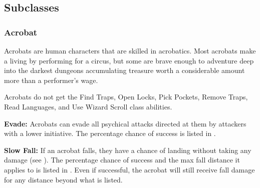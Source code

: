 \begin{multicols*}{2}

\subsection{Subclasses}
\subsubsection{Acrobat}
Acrobats are human characters that are skilled in acrobatics. Most acrobats make a living by performing for a circus, but some are brave enough to adventure deep into the darkest dungeons accumulating treasure worth a considerable amount more than a performer's wage.

Acrobats do not get the Find Traps, Open Locks, Pick Pockets, Remove Traps, Read Languages, and Use Wizard Scroll class abilities.

\textbf{Evade:} Acrobats can evade all psychical attacks directed at them by attackers with a lower initiative. The percentage chance of success is listed in .

\textbf{Slow Fall:} If an acrobat falls, they have a chance of landing without taking any damage (see ). The percentage chance of success and the max fall distance it applies to is listed in . Even if successful, the acrobat will still receive fall damage for any distance beyond what is listed.



\end{multicols*}
